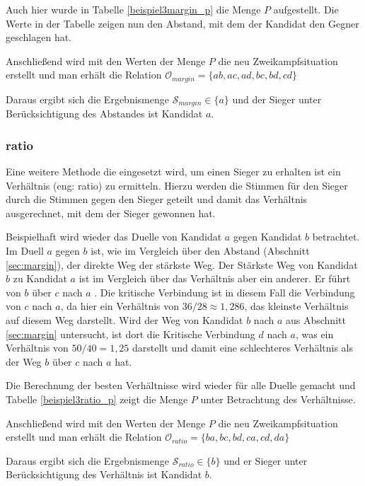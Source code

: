 Auch hier wurde in Tabelle \ref{beispiel3margin_p} die Menge $P$ aufgestellt. Die Werte in der Tabelle zeigen nun den Abstand, mit dem der Kandidat den Gegner geschlagen hat.



Anschließend wird mit den Werten der Menge $P$ die neu Zweikampfsituation erstellt und man erhält die Relation $\mathcal{O}_{margin} = \{ ab, ac,ad,bc,bd,cd \}$

Daraus ergibt sich die Ergebnismenge $\mathcal{S}_{margin} \in \{ a\}$ und der Sieger unter Berücksichtigung des Abstandes ist Kandidat $a$.

\subsubsection{ratio}
\label{sec:ratio}
Eine weitere Methode die eingesetzt wird, um einen Sieger zu erhalten ist ein Verhältnis (eng: ratio) zu ermitteln. Hierzu werden die Stimmen für den Sieger durch die Stimmen gegen den Sieger geteilt und damit das Verhältnis ausgerechnet, mit dem der Sieger gewonnen hat.

Beispielhaft wird wieder das Duelle von Kandidat $a$ gegen Kandidat $b$ betrachtet. Im Duell $a$ gegen $b$ ist, wie im Vergleich über den Abstand (Abschnitt \ref{sec:margin}), der direkte Weg der stärkste Weg. Der Stärkste Weg von Kandidat $b$ zu Kandidat $a$ ist im Vergleich über das Verhältnis aber ein anderer. Er führt von $b$ über $c$ nach $a$ . Die kritische Verbindung ist in diesem Fall die Verbindung von $c$ nach $a$, da hier ein Verhältnis von $36/28 \approx 1,286$, das kleinste Verhältnis auf diesem Weg darstellt. Wird der Weg von Kandidat $b$ nach $a$ aus Abschnitt \ref{sec:margin} untersucht, ist dort die Kritische Verbindung $d$ nach $a$, was ein Verhältnis von $ 50/40 = 1,25$ darstellt und damit eine schlechteres Verhältnis als der Weg $b$ über $c$ nach $a$ hat.

Die Berechnung der besten Verhältnisse wird wieder für alle Duelle gemacht und  Tabelle \ref{beispiel3ratio_p} zeigt die Menge $P$ unter Betrachtung des Verhältnisse.



Anschließend wird mit den Werten der Menge $P$ die neu Zweikampfsituation erstellt und man erhält die Relation $\mathcal{O}_{ratio} = \{ ba,bc,bd,ca,cd,da \}$

Daraus ergibt sich die Ergebnismenge $\mathcal{S}_{ratio} \in \{ b\}$ und er Sieger unter Berücksichtigung des Verhältnis ist Kandidat $b$.

